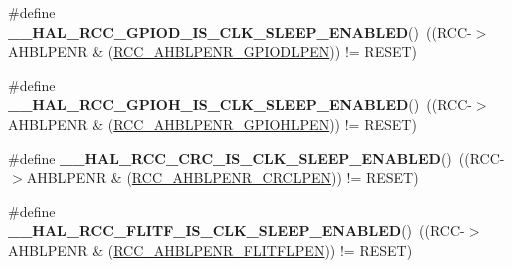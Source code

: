 \begin{DoxyCompactItemize}
\item 
\hypertarget{group___r_c_c___a_h_b___clock___sleep___enable___disable___status_ga9be4e7cb3610f3242eedb2c38f05cafe}{\#define {\bfseries \-\_\-\-\_\-\-H\-A\-L\-\_\-\-R\-C\-C\-\_\-\-G\-P\-I\-O\-D\-\_\-\-I\-S\-\_\-\-C\-L\-K\-\_\-\-S\-L\-E\-E\-P\-\_\-\-E\-N\-A\-B\-L\-E\-D}()~((R\-C\-C-\/$>$A\-H\-B\-L\-P\-E\-N\-R \& (\hyperlink{group___peripheral___registers___bits___definition_ga25cad84f367cbe2ecdbea5a5b3f0d605}{R\-C\-C\-\_\-\-A\-H\-B\-L\-P\-E\-N\-R\-\_\-\-G\-P\-I\-O\-D\-L\-P\-E\-N})) != R\-E\-S\-E\-T)}\label{group___r_c_c___a_h_b___clock___sleep___enable___disable___status_ga9be4e7cb3610f3242eedb2c38f05cafe}

\item 
\hypertarget{group___r_c_c___a_h_b___clock___sleep___enable___disable___status_gac60e430f28a40aecfc376ad9c00e94f5}{\#define {\bfseries \-\_\-\-\_\-\-H\-A\-L\-\_\-\-R\-C\-C\-\_\-\-G\-P\-I\-O\-H\-\_\-\-I\-S\-\_\-\-C\-L\-K\-\_\-\-S\-L\-E\-E\-P\-\_\-\-E\-N\-A\-B\-L\-E\-D}()~((R\-C\-C-\/$>$A\-H\-B\-L\-P\-E\-N\-R \& (\hyperlink{group___peripheral___registers___bits___definition_ga13b804e2e8ae7920a8db3a1828ff3b42}{R\-C\-C\-\_\-\-A\-H\-B\-L\-P\-E\-N\-R\-\_\-\-G\-P\-I\-O\-H\-L\-P\-E\-N})) != R\-E\-S\-E\-T)}\label{group___r_c_c___a_h_b___clock___sleep___enable___disable___status_gac60e430f28a40aecfc376ad9c00e94f5}

\item 
\hypertarget{group___r_c_c___a_h_b___clock___sleep___enable___disable___status_ga1983077cf8fed9d77dbb4950a46a3b7e}{\#define {\bfseries \-\_\-\-\_\-\-H\-A\-L\-\_\-\-R\-C\-C\-\_\-\-C\-R\-C\-\_\-\-I\-S\-\_\-\-C\-L\-K\-\_\-\-S\-L\-E\-E\-P\-\_\-\-E\-N\-A\-B\-L\-E\-D}()~((R\-C\-C-\/$>$A\-H\-B\-L\-P\-E\-N\-R \& (\hyperlink{group___peripheral___registers___bits___definition_ga24b72821d1df0037ffad16d4e7aefc48}{R\-C\-C\-\_\-\-A\-H\-B\-L\-P\-E\-N\-R\-\_\-\-C\-R\-C\-L\-P\-E\-N})) != R\-E\-S\-E\-T)}\label{group___r_c_c___a_h_b___clock___sleep___enable___disable___status_ga1983077cf8fed9d77dbb4950a46a3b7e}

\item 
\hypertarget{group___r_c_c___a_h_b___clock___sleep___enable___disable___status_ga968fb378568454a2913e11a238131ae4}{\#define {\bfseries \-\_\-\-\_\-\-H\-A\-L\-\_\-\-R\-C\-C\-\_\-\-F\-L\-I\-T\-F\-\_\-\-I\-S\-\_\-\-C\-L\-K\-\_\-\-S\-L\-E\-E\-P\-\_\-\-E\-N\-A\-B\-L\-E\-D}()~((R\-C\-C-\/$>$A\-H\-B\-L\-P\-E\-N\-R \& (\hyperlink{group___peripheral___registers___bits___definition_ga216c6dc7dadf00b88d1b0585b68e23f0}{R\-C\-C\-\_\-\-A\-H\-B\-L\-P\-E\-N\-R\-\_\-\-F\-L\-I\-T\-F\-L\-P\-E\-N})) != R\-E\-S\-E\-T)}\label{group___r_c_c___a_h_b___clock___sleep___enable___disable___status_ga968fb378568454a2913e11a238131ae4}


\end{DoxyCompactItemize}
